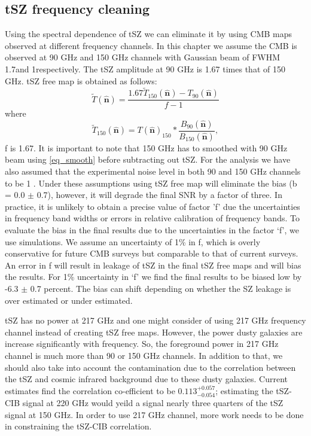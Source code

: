 \subsection{tSZ frequency cleaning}
\label{subsec:tszbias}
 Using the spectral dependence of tSZ we can eliminate it by using CMB maps observed at different frequency channels.
 In this chapter we assume the CMB is observed at 90 GHz and 150 GHz channels with Gaussian beam of FWHM 1.7\am and 1\am respectively.
 The tSZ amplitude at 90 GHz is 1.67 times that of 150 GHz.
 tSZ free map is obtained as follows:
 \begin{equation}
\widetilde{T}(\hat{\textbf{n}})  =  \frac{1.67\widetilde{T}_{{150}}(\hat{\textbf{n}}) - T_{{90}}(\hat{\textbf{n}})}{f-1}
\end{equation}
where
\begin{equation}
\widetilde{T}_{{150}}(\hat{\textbf{n}})  =  T(\hat{\textbf{n}})_{{150}} \ast \frac{B_{{90}}(\hat{\textbf{n}})}{B_{{150}}(\hat{\textbf{n}})},
\label{eq_smooth}
\end{equation}
 f is 1.67. It is important to note that 150 GHz has to smoothed with 90 GHz beam using \ref{eq_smooth} before subtracting out tSZ.
  For the analysis we have also assumed that the experimental noise level in both 90 and 150 GHz channels to be 1 \ukam. 
  Under these assumptions using tSZ free map will eliminate the bias (b = 0.0 $\pm$ 0.7), however, it will degrade the final SNR by a factor of three.
  In practice, it is unlikely to obtain a precise value of factor 'f' due the uncertainties in frequency band widths or errors in relative calibration of frequency bands.
  To evaluate the bias in the final results due to the uncertainties in the factor `f', we use simulations. 
  We assume an uncertainty of 1\% in f, which is overly conservative for future CMB surveys but comparable to that of current surveys.
 An error in f will result in leakage of tSZ in the final tSZ free maps and will bias the results.
 For 1\% uncertainty in `f' we find the final results to be biased low by -6.3 $\pm$ 0.7 percent. 
 The bias can shift depending on whether the SZ leakage is over estimated or under estimated.
  
tSZ has no power at 217 GHz and one might consider of using 217 GHz frequency channel instead of creating tSZ free maps. 
However, the power dusty galaxies are increase significantly with frequency.
So, the foreground power in 217 GHz channel is much more than 90 or 150 GHz channels. 
In addition to that, we should also take into account the contamination due to the correlation between the tSZ and cosmic infrared background due to these dusty galaxies.
 Current estimates find the correlation co-efficient to be $0.113^{+0.057}_{-0.054}$; estimating the tSZ-CIB signal at 220 GHz would yeild a signal nearly three quarters of the tSZ signal at 150 GHz. 
 In order to use 217 GHz channel, more work needs to be done in constraining the tSZ-CIB correlation.
 
